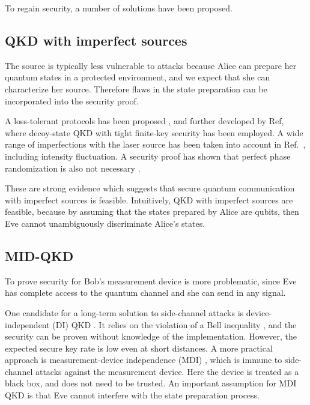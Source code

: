 \documentclass[reprint,
superscriptaddress,
 amsmath,amssymb,
 aps,
prb,
]{revtex4-1}
\begin{document}
To regain security, a number of solutions have been proposed. 

\subsection{QKD with imperfect sources}

The source is typically less vulnerable to attacks because Alice can prepare her quantum states in
a protected environment, and we expect that she can characterize her source. Therefore flaws in the state preparation can be incorporated into the security proof.


A loss-tolerant protocols has been proposed \cite{PhysRevA.90.052314}, and further developed by Ref\cite{PhysRevA.92.032305}, where
decoy-state QKD with tight finite-key security has been employed. A wide range of imperfections with the laser source has been taken into account in Ref.~\cite{mizutani2015finite}, including intensity fluctuation.  A security proof has shown that perfect phase randomization is also not necessary \cite{cao2015discrete}.


These are strong evidence which suggests that secure quantum communication with imperfect sources is feasible\cite{diamanti2016practical}. Intuitively, QKD with imperfect sources are feasible, because by assuming that the states prepared by Alice are qubits, then Eve cannot unambiguously discriminate Alice's states\cite{diamanti2016practical}. 



\subsection{MID-QKD}

To prove security for Bob's measurement device is more problematic, since Eve has complete access to the quantum channel and she can send in any signal. 

One candidate for a long-term solution to side-channel attacks is device-independent (DI) QKD \cite{PhysRevLett.98.230501}. It relies on the violation of a Bell inequality \cite{hensen2015loophole}, and the security can be proven without knowledge of the implementation. However, the expected secure key rate is low even at short distances. A more practical approach is measurement-device independence (MDI) \cite{PhysRevLett.108.130503}, which is immune to side-channel attacks against the measurement device. Here the device is treated as a black box, and does not need to be trusted. An important assumption for MDI QKD is that Eve cannot interfere with the state preparation process. 
\end{document}
